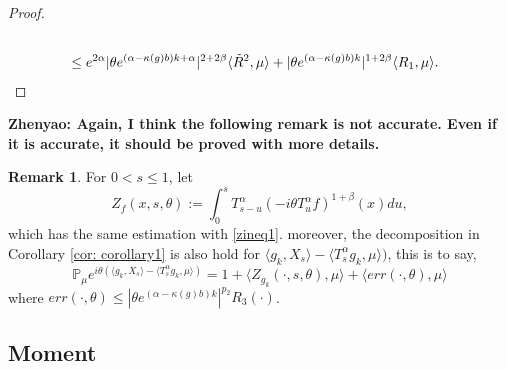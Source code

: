\documentclass[12pt, a4paper]{amsart}
\theoremstyle{definition}
\newtheorem{rem}[thm]{Remark}
\numberwithin{equation}{section}
\begin{document}
\begin{proof}
\begin{align*}
    \\&\leq e^{2\alpha}|\theta e^{(\alpha-\kappa(g)b)k+\alpha}|^{2+2\beta}\langle \tilde R^2,\mu\rangle + |\theta e^{(\alpha-\kappa(g)b)k}|^{1+2\beta}\langle R_1,\mu\rangle.
    \qedhere
\end{align*}
\end{proof}
    {\bf Zhenyao: Again, I think the following remark is not accurate. Even if it is accurate, it should be proved with more details.}
\begin{rem}
\label{remark1}
   For $0<s\leq 1$, let
   $$Z_f(x,s,\theta):=\int_0^s T^{\alpha}_{s-u}(-i\theta T_u^{\alpha}f)^{1+\beta}(x)du ,$$
   which has the same estimation with \eqref{zineq1}. moreover, the decomposition in Corollary \ref{cor: corollary1} is also hold for $\langle g_k, X_s\rangle-\langle T_s^{\alpha}g_k,\mu \rangle)$, this is to say,
   $$\mathbb{P}_{\mu}e^{i\theta(\langle g_k, X_s\rangle-\langle T_s^{\alpha}g_k,\mu \rangle)}=1+\langle Z_{g_k}(\cdot,s,\theta),\mu\rangle+\langle err(\cdot,\theta),\mu\rangle$$
   where $err(\cdot,\theta)\leq |\theta e^{(\alpha-\kappa(g)b)k}|^{p_2}R_3(\cdot)$.
\end{rem}

\subsection{Moment}
\end{document}
